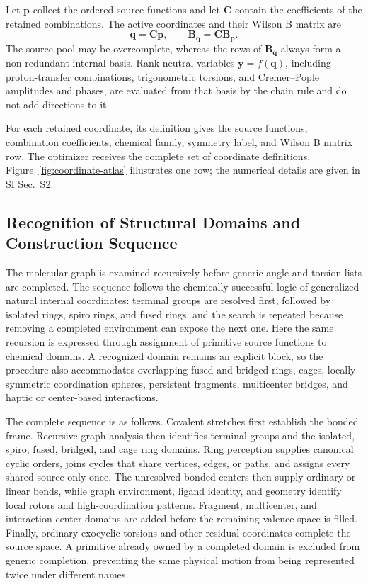 \documentclass[journal=jctcce,manuscript=article,layout=traditional]{achemso}
\newcommand{\Bmat}{\mathbf{B}}
\newcommand{\q}{\mathbf{q}}
\newcommand{\y}{\mathbf{y}}
\theoremstyle{definition}
\begin{document}
Let \(\mathbf p\) collect the ordered source functions and let \(\mathbf C\)
contain the coefficients of the retained combinations.  The active
coordinates and their {Wilson B matrix} are
\begin{equation}
  \q=\mathbf C\mathbf p,
  \qquad
  \Bmat_{\q}=\mathbf C\Bmat_{\mathbf p}.
  \label{eq:source-to-active}
\end{equation}
The source pool may be overcomplete, whereas the rows of
\(\Bmat_{\q}\) always form a non-redundant internal basis.  Rank-neutral
variables \(\y=f(\q)\), including proton-transfer combinations,
trigonometric torsions, and Cremer--Pople amplitudes and phases, are evaluated
from that basis by the chain rule and do not add directions to it.

{For each retained coordinate, its definition gives the source functions, combination
coefficients, chemical family, symmetry label, and Wilson B matrix row.  The optimizer receives the complete set of coordinate
definitions.  Figure~\ref{fig:coordinate-atlas} illustrates one row; the
numerical details are given in SI Sec.~S2.}

\subsection{Recognition of Structural Domains and Construction Sequence}

The molecular graph is examined recursively before generic angle and torsion
lists are completed.  The sequence follows the chemically successful logic of
generalized natural internal coordinates: terminal groups are resolved first,
followed by isolated rings, spiro rings, and fused rings, and the
search is repeated because removing a completed environment can expose the
next one.\cite{VonArnimAhlrichs1999GNIC}  Here the same recursion is expressed
through assignment of primitive source functions to chemical domains.  A recognized domain remains an explicit
block, so the procedure also accommodates overlapping fused and bridged rings,
cages, locally symmetric coordination spheres, persistent fragments,
multicenter bridges, and haptic or center-based interactions.

The complete sequence is as follows.  Covalent stretches first establish the
bonded frame.  Recursive graph analysis then identifies terminal groups and
the isolated, spiro, fused, bridged, and cage ring domains.  Ring perception
supplies canonical cyclic orders, joins cycles that share vertices, edges, or
paths, and assigns every shared source only once.\cite{Downs1989RingPerception,Lee2009RingPerception,MaySteinbeck2014Rings}  The unresolved bonded
centers then supply ordinary or linear bends, while graph environment, ligand
identity, and geometry identify local rotors and high-coordination patterns.
Fragment, multicenter, and interaction-center domains are added before the
remaining valence space is filled.  Finally, ordinary exocyclic torsions and
other residual coordinates complete the source space.  A primitive already
owned by a completed domain is excluded from generic completion, preventing
the same physical motion from being represented twice under different names.
\end{document}
